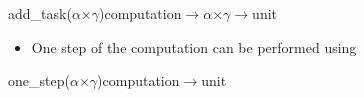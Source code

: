 \documentclass[xcolor=dvipsnames,8pt]{beamer}
\begin{document}
\begin{frame}
{{\begin{minipage}{\textwidth}
\noindent{}\hspace*{1.22ex}add\_{}task\hspace*{1.22ex}(\ensuremath{\alpha}\hspace*{1.22ex}\ensuremath{\times}\hspace*{1.22ex}\ensuremath{\gamma})\hspace*{1.22ex}computation\hspace*{1.22ex}\ensuremath{\rightarrow}\hspace*{1.22ex}\ensuremath{\alpha}\hspace*{1.22ex}\ensuremath{\times}\hspace*{1.22ex}\ensuremath{\gamma}\hspace*{1.22ex}\ensuremath{\rightarrow}\hspace*{1.22ex}unit
\end{minipage}}}


\medskip\noindent
  \begin{itemize}
  \item One step of the computation can be performed using
  \end{itemize}


\medskip\noindent
{\colorbox{tmpcolor}{\begin{minipage}{\textwidth}\tt\parindent 0pt

\noindent{}\hspace*{1.22ex}one\_{}step\hspace*{1.22ex}(\ensuremath{\alpha}\hspace*{1.22ex}\ensuremath{\times}\hspace*{1.22ex}\ensuremath{\gamma})\hspace*{1.22ex}computation\hspace*{1.22ex}\ensuremath{\rightarrow}\hspace*{1.22ex}unit
\end{minipage}}}


\medskip\noindent
\end{frame}

\end{document}
